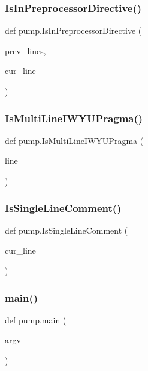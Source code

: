 \subsubsection{\texorpdfstring{IsInPreprocessorDirective()}{IsInPreprocessorDirective()}}
{\footnotesize\ttfamily def pump.\+Is\+In\+Preprocessor\+Directive (\begin{DoxyParamCaption}\item[{}]{prev\+\_\+lines,  }\item[{}]{cur\+\_\+line }\end{DoxyParamCaption})}

\mbox{\label{namespacepump_a707a3ff4514c89607e48a87589aed787}} 
\subsubsection{\texorpdfstring{IsMultiLineIWYUPragma()}{IsMultiLineIWYUPragma()}}
{\footnotesize\ttfamily def pump.\+Is\+Multi\+Line\+I\+W\+Y\+U\+Pragma (\begin{DoxyParamCaption}\item[{}]{line }\end{DoxyParamCaption})}

\mbox{\label{namespacepump_a417078b1d036b67756c47e5dc50324dc}} 
\subsubsection{\texorpdfstring{IsSingleLineComment()}{IsSingleLineComment()}}
{\footnotesize\ttfamily def pump.\+Is\+Single\+Line\+Comment (\begin{DoxyParamCaption}\item[{}]{cur\+\_\+line }\end{DoxyParamCaption})}

\mbox{\label{namespacepump_abcf26971f7bdbad77c2c168c110312df}} 
\subsubsection{\texorpdfstring{main()}{main()}}
{\footnotesize\ttfamily def pump.\+main (\begin{DoxyParamCaption}\item[{}]{argv }\end{DoxyParamCaption})}

